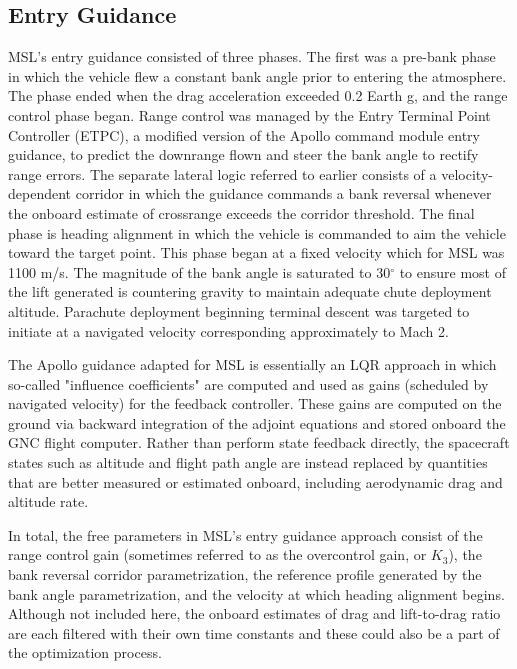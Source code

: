 \documentclass[10pt,a4paper]{article}
\begin{document}
	\subsection{Entry Guidance}
	MSL's entry guidance consisted of three phases. The first was a pre-bank phase in which the vehicle flew a constant bank angle prior to entering the atmosphere. The phase ended when the drag acceleration exceeded 0.2 Earth g, and the range control phase began. Range control was managed by the Entry Terminal Point Controller (ETPC), a modified version of the Apollo command module entry guidance, to predict the downrange flown and steer the bank angle to rectify range errors. The separate lateral logic referred to earlier consists of a velocity-dependent corridor in which the guidance commands a bank reversal whenever the onboard estimate of crossrange exceeds the corridor threshold. The final phase is heading alignment in which the vehicle is commanded to aim the vehicle toward the target point. This phase began at a fixed velocity which for MSL was 1100 m/s. The magnitude of the bank angle is saturated to 30$^\circ$ to ensure most of the lift generated is countering gravity to maintain adequate chute deployment altitude. Parachute deployment beginning terminal descent was targeted to initiate at a navigated velocity corresponding approximately to Mach 2.
	
	The Apollo guidance adapted for MSL is essentially an LQR approach in which so-called "influence coefficients" are computed and used as gains (scheduled by navigated velocity) for the feedback controller. These gains are computed on the ground via backward integration of the adjoint equations and stored onboard the GNC flight computer.  Rather than perform state feedback directly, the spacecraft states such as altitude and flight path angle are instead replaced by quantities that are better measured or estimated onboard, including aerodynamic drag and altitude rate.
	
	In total, the free parameters in MSL's entry guidance approach consist of the range control gain (sometimes referred to as the overcontrol gain, or $ K_3 $), the bank reversal corridor parametrization, the reference profile generated by the bank angle parametrization, and the velocity at which heading alignment begins. Although not included here, the onboard estimates of drag and lift-to-drag ratio are each filtered with their own time constants \cite{MSL_EDL_Overview_JPL} and these could also be a part of the optimization process.
		
\end{document}

